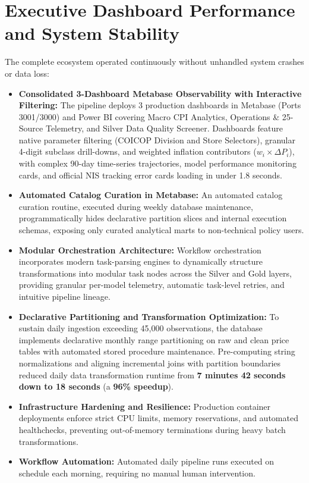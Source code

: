\section{Executive Dashboard Performance and System Stability}
\hs The complete ecosystem operated continuously without unhandled system crashes or data loss:
\begin{itemize}
    \item \textbf{Consolidated 3-Dashboard Metabase Observability with Interactive Filtering:} The pipeline deploys 3 production dashboards in Metabase (Ports 3001/3000) and Power BI covering Macro CPI Analytics, Operations \& 25-Source Telemetry, and Silver Data Quality Screener. Dashboards feature native parameter filtering (COICOP Division and Store Selectors), granular 4-digit subclass drill-downs, and weighted inflation contributors ($w_i \times \Delta P_i$), with complex 90-day time-series trajectories, model performance monitoring cards, and official NIS tracking error cards loading in under 1.8 seconds.
    \item \textbf{Automated Catalog Curation in Metabase:} An automated catalog curation routine, executed during weekly database maintenance, programmatically hides declarative partition slices and internal execution schemas, exposing only curated analytical marts to non-technical policy users.
    \item \textbf{Modular Orchestration Architecture:} Workflow orchestration incorporates modern task-parsing engines to dynamically structure transformations into modular task nodes across the Silver and Gold layers, providing granular per-model telemetry, automatic task-level retries, and intuitive pipeline lineage.
    \item \textbf{Declarative Partitioning and Transformation Optimization:} To sustain daily ingestion exceeding 45,000 observations, the database implements declarative monthly range partitioning on raw and clean price tables with automated stored procedure maintenance. Pre-computing string normalizations and aligning incremental joins with partition boundaries reduced daily data transformation runtime from \textbf{7 minutes 42 seconds down to 18 seconds} (a \textbf{96\% speedup}).
    \item \textbf{Infrastructure Hardening and Resilience:} Production container deployments enforce strict CPU limits, memory reservations, and automated healthchecks, preventing out-of-memory terminations during heavy batch transformations.
    \item \textbf{Workflow Automation:} Automated daily pipeline runs executed on schedule each morning, requiring no manual human intervention.

\end{itemize}
